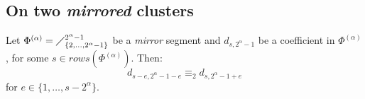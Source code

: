 \subsection{On two \emph{mirrored} clusters}

\begin{theorem}
    Let $\Phi^{(\alpha)}=\diagup_{\lbrace 2,\ldots,2^{\alpha}-1\rbrace}^{2^{\alpha}-1}$
    be a \emph{mirror} segment and $d_{s,2^{{\alpha}}-1}$ 
    be a coefficient in $\Phi^{(\alpha)}$, for some $s\in rows\left(\Phi^{(\alpha)}\right)$. Then:
    \begin{displaymath}
        d_{s-e,2^{{\alpha}}-1-e} \equiv_{2} d_{s,2^{{\alpha}}-1+e}
    \end{displaymath}
    for $e\in\lbrace1,\ldots,s-2^{{\alpha}}\rbrace$.
    \label{thm:two:mirrored:clusters}
\end{theorem}

